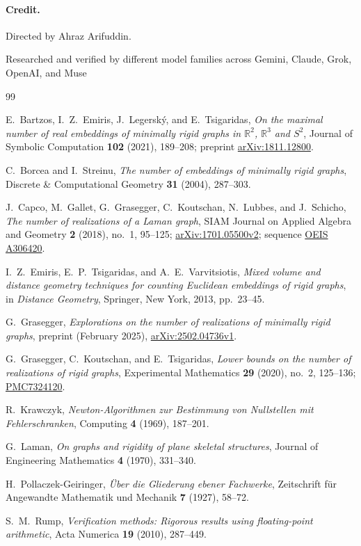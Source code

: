 \documentclass[11pt,a4paper]{article}
\theoremstyle{definition}
\theoremstyle{remark}
\begin{document}
\paragraph{Credit.}
Directed by Ahraz Arifuddin.

Researched and verified by different model families across Gemini, Claude, Grok, OpenAI, and Muse

\begin{thebibliography}{99}

E.~Bartzos, I.~Z.~Emiris, J.~Legersk\'{y}, and E.~Tsigaridas,
\emph{On the maximal number of real embeddings of minimally rigid graphs in $\mathbb{R}^2$, $\mathbb{R}^3$ and $S^2$},
Journal of Symbolic Computation \textbf{102} (2021), 189--208; preprint \href{https://arxiv.org/pdf/1811.12800}{arXiv:1811.12800}.

C.~Borcea and I.~Streinu,
\emph{The number of embeddings of minimally rigid graphs},
Discrete \& Computational Geometry \textbf{31} (2004), 287--303.

J.~Capco, M.~Gallet, G.~Grasegger, C.~Koutschan, N.~Lubbes, and J.~Schicho,
\emph{The number of realizations of a Laman graph},
SIAM Journal on Applied Algebra and Geometry \textbf{2} (2018), no.~1, 95--125; \href{https://arxiv.org/html/1701.05500v2}{arXiv:1701.05500v2}; sequence \href{https://oeis.org/A306420}{OEIS A306420}.

I.~Z.~Emiris, E.~P.~Tsigaridas, and A.~E.~Varvitsiotis,
\emph{Mixed volume and distance geometry techniques for counting Euclidean embeddings of rigid graphs},
in \emph{Distance Geometry}, Springer, New York, 2013, pp.~23--45.

G.~Grasegger,
\emph{Explorations on the number of realizations of minimally rigid graphs},
preprint (February 2025), \href{https://arxiv.org/html/2502.04736v1}{arXiv:2502.04736v1}.

G.~Grasegger, C.~Koutschan, and E.~Tsigaridas,
\emph{Lower bounds on the number of realizations of rigid graphs},
Experimental Mathematics \textbf{29} (2020), no.~2, 125--136; \href{https://pmc.ncbi.nlm.nih.gov/articles/PMC7324120/}{PMC7324120}.

R.~Krawczyk,
\emph{Newton-Algorithmen zur Bestimmung von Nullstellen mit Fehlerschranken},
Computing \textbf{4} (1969), 187--201.

G.~Laman,
\emph{On graphs and rigidity of plane skeletal structures},
Journal of Engineering Mathematics \textbf{4} (1970), 331--340.

H.~Pollaczek-Geiringer,
\emph{\"{U}ber die Gliederung ebener Fachwerke},
Zeitschrift f\"{u}r Angewandte Mathematik und Mechanik \textbf{7} (1927), 58--72.

S.~M.~Rump,
\emph{Verification methods: Rigorous results using floating-point arithmetic},
Acta Numerica \textbf{19} (2010), 287--449.

\end{thebibliography}
\end{document}
